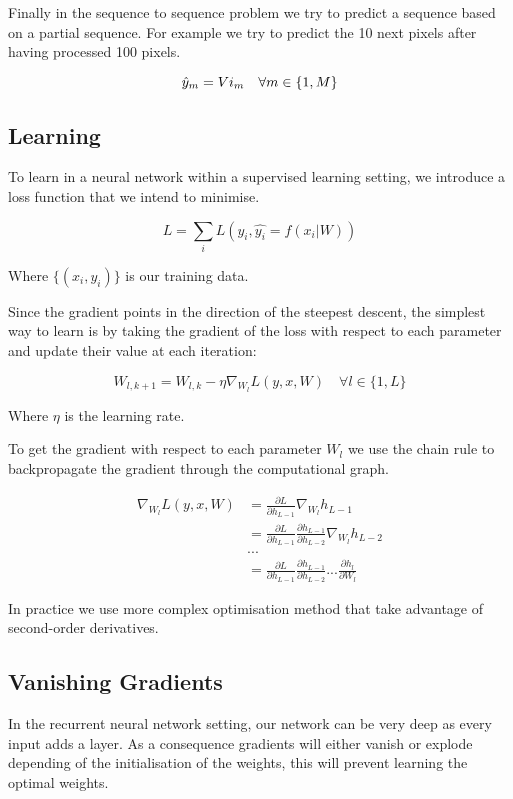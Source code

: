 \documentclass[10pt,oneside,openright]{report}
\begin{document}
Finally in the sequence to sequence problem we try to predict a sequence based on a partial sequence. For example we try to predict the 10 next pixels after having processed 100 pixels.

\begin{equation}
          \hat{y}_{m} = V i_{m} \quad \forall m \in \{1, M\}\\
\end{equation}

\subsection{Learning}
To learn in a neural network within a supervised learning setting, we introduce a loss function that we intend to minimise.

$$L = \sum_i L(y_i, \hat{y_i} = f(x_i|W))$$

Where $\{(x_i, y_i)\}$ is our training data. 

Since the gradient points in the direction of the steepest descent, the simplest way to learn is by taking the gradient of the loss with respect to each parameter and update their value at each iteration:

$$ W_{l, k+1} = W_{l, k} - \eta \nabla_{W_l} L(y, x, W) \quad \forall l \in \{1, L\}$$

Where $\eta$ is the learning rate.
 
To get the gradient with respect to each parameter $W_l$ we use the chain rule to backpropagate the gradient through the computational graph.
 
 \begin{align}
   \nabla_{W_l} L(y, x, W) &= \frac{\partial L}{\partial h_{L-1}} \nabla_{W_l} h_{L-1}\\
   &= \frac{\partial L}{\partial h_{L-1}} \frac{\partial h_{L-1}}{\partial h_{L-2}} \nabla_{W_l} h_{L-2}\\
   &...\\
   &= \frac{\partial L}{\partial h_{L-1}} \frac{\partial h_{L-1}}{\partial h_{L-2}} ... \frac{\partial h_l}{\partial W_l}
 \end{align}
 
In practice we use more complex optimisation method that take advantage of second-order derivatives. 
 
\subsection{Vanishing Gradients}
In the recurrent neural network setting, our network can be very deep as every input adds a layer. As a consequence gradients will either vanish or explode depending of the initialisation of the weights, this will prevent learning the optimal weights.
\end{document}
